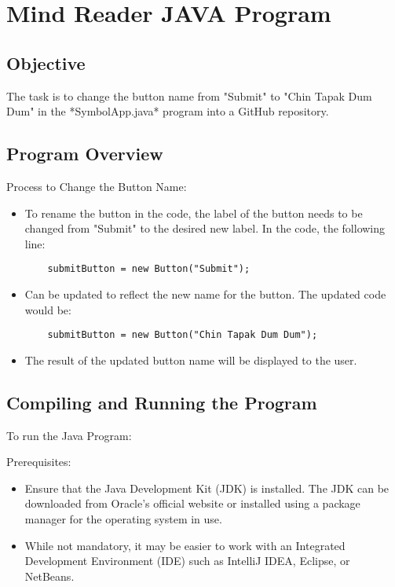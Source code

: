 \section{Mind Reader JAVA Program}
\subsection{Objective}
The task is to change the button name from "Submit" to "Chin Tapak Dum Dum" in the *SymbolApp.java* program into a GitHub repository.

\subsection{Program Overview}
Process to Change the Button Name:
\begin{itemize}
    \item To rename the button in the code, the label of the button needs to be changed from "Submit" to the desired new label. In the code, the following line:
    \begin{verbatim}
    submitButton = new Button("Submit");
    \end{verbatim}
    \item Can be updated to reflect the new name for the button. The updated code would be:
    \begin{verbatim}
    submitButton = new Button("Chin Tapak Dum Dum");
    \end{verbatim}
    \item The result of the updated button name will be displayed to the user.
\end{itemize}

\subsection{Compiling and Running the Program}
To run the Java Program:

Prerequisites:
\begin{itemize}
    \item Ensure that the Java Development Kit (JDK) is installed. The JDK can be downloaded from Oracle's official website or installed using a package manager for the operating system in use.
    \item While not mandatory, it may be easier to work with an Integrated Development Environment (IDE) such as IntelliJ IDEA, Eclipse, or NetBeans.
\end{itemize}

